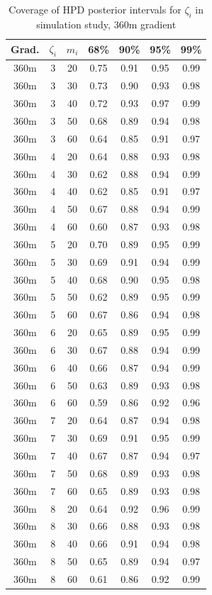 \begin{table}
\begin{center}
\caption{Coverage of HPD posterior intervals for $\zeta_i$ in simulation study, 360m gradient
\label{tab:sim_coverage_360m}}
\begin{tabular}{ccc|cccc}
 Grad. & $\zeta_i$ & $m_i$ & 68\% & 90\% & 95\% & 99\% \\ 
 \hline
360m &   3 &  20 & 0.75 & 0.91 & 0.95 & 0.99 \\ 
  360m &   3 &  30 & 0.73 & 0.90 & 0.93 & 0.98 \\ 
  360m &   3 &  40 & 0.72 & 0.93 & 0.97 & 0.99 \\ 
  360m &   3 &  50 & 0.68 & 0.89 & 0.94 & 0.98 \\ 
  360m &   3 &  60 & 0.64 & 0.85 & 0.91 & 0.97 \\ 
   \hline
360m &   4 &  20 & 0.64 & 0.88 & 0.93 & 0.98 \\ 
  360m &   4 &  30 & 0.62 & 0.88 & 0.94 & 0.99 \\ 
  360m &   4 &  40 & 0.62 & 0.85 & 0.91 & 0.97 \\ 
  360m &   4 &  50 & 0.67 & 0.88 & 0.94 & 0.99 \\ 
  360m &   4 &  60 & 0.60 & 0.87 & 0.93 & 0.98 \\ 
   \hline
360m &   5 &  20 & 0.70 & 0.89 & 0.95 & 0.99 \\ 
  360m &   5 &  30 & 0.69 & 0.91 & 0.94 & 0.99 \\ 
  360m &   5 &  40 & 0.68 & 0.90 & 0.95 & 0.98 \\ 
  360m &   5 &  50 & 0.62 & 0.89 & 0.95 & 0.99 \\ 
  360m &   5 &  60 & 0.67 & 0.86 & 0.94 & 0.98 \\ 
   \hline
360m &   6 &  20 & 0.65 & 0.89 & 0.95 & 0.99 \\ 
  360m &   6 &  30 & 0.67 & 0.88 & 0.94 & 0.99 \\ 
  360m &   6 &  40 & 0.66 & 0.87 & 0.94 & 0.99 \\ 
  360m &   6 &  50 & 0.63 & 0.89 & 0.93 & 0.98 \\ 
  360m &   6 &  60 & 0.59 & 0.86 & 0.92 & 0.96 \\ 
   \hline
360m &   7 &  20 & 0.64 & 0.87 & 0.94 & 0.98 \\ 
  360m &   7 &  30 & 0.69 & 0.91 & 0.95 & 0.99 \\ 
  360m &   7 &  40 & 0.67 & 0.87 & 0.94 & 0.97 \\ 
  360m &   7 &  50 & 0.68 & 0.89 & 0.93 & 0.98 \\ 
  360m &   7 &  60 & 0.65 & 0.89 & 0.93 & 0.98 \\ 
   \hline
360m &   8 &  20 & 0.64 & 0.92 & 0.96 & 0.99 \\ 
  360m &   8 &  30 & 0.66 & 0.88 & 0.93 & 0.98 \\ 
  360m &   8 &  40 & 0.66 & 0.91 & 0.94 & 0.98 \\ 
  360m &   8 &  50 & 0.65 & 0.89 & 0.94 & 0.97 \\ 
  360m &   8 &  60 & 0.61 & 0.86 & 0.92 & 0.99 \\ 
   \hline
\end{tabular}
\end{center}
\end{table}

